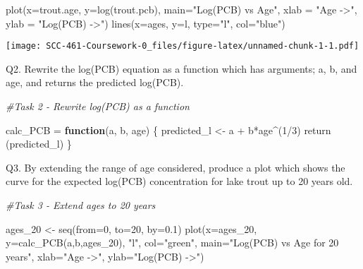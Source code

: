 \documentclass[
]{article}
\newenvironment{Shaded}{\begin{snugshade}}{\end{snugshade}}
\newcommand{\AttributeTok}[1]{\textcolor[rgb]{0.77,0.63,0.00}{#1}}
\newcommand{\CommentTok}[1]{\textcolor[rgb]{0.56,0.35,0.01}{\textit{#1}}}
\newcommand{\ControlFlowTok}[1]{\textcolor[rgb]{0.13,0.29,0.53}{\textbf{#1}}}
\newcommand{\DecValTok}[1]{\textcolor[rgb]{0.00,0.00,0.81}{#1}}
\newcommand{\FloatTok}[1]{\textcolor[rgb]{0.00,0.00,0.81}{#1}}
\newcommand{\FunctionTok}[1]{\textcolor[rgb]{0.00,0.00,0.00}{#1}}
\newcommand{\NormalTok}[1]{#1}
\newcommand{\OtherTok}[1]{\textcolor[rgb]{0.56,0.35,0.01}{#1}}
\newcommand{\SpecialCharTok}[1]{\textcolor[rgb]{0.00,0.00,0.00}{#1}}
\newcommand{\StringTok}[1]{\textcolor[rgb]{0.31,0.60,0.02}{#1}}
\begin{document}
\begin{Shaded}
\begin{Highlighting}[]
\FunctionTok{plot}\NormalTok{(}\AttributeTok{x=}\NormalTok{trout.age, }\AttributeTok{y=}\FunctionTok{log}\NormalTok{(trout.pcb), }\AttributeTok{main=}\StringTok{"Log(PCB) vs Age"}\NormalTok{, }\AttributeTok{xlab =} \StringTok{"Age {-}\textgreater{}"}\NormalTok{, }\AttributeTok{ylab =} \StringTok{"Log(PCB) {-}\textgreater{}"}\NormalTok{)}
\FunctionTok{lines}\NormalTok{(}\AttributeTok{x=}\NormalTok{ages, }\AttributeTok{y=}\NormalTok{l, }\AttributeTok{type=}\StringTok{"l"}\NormalTok{, }\AttributeTok{col=}\StringTok{"blue"}\NormalTok{)}
\end{Highlighting}
\end{Shaded}

\texttt{[image: SCC-461-Coursework-0\_files/figure-latex/unnamed-chunk-1-1.pdf]}

Q2. Rewrite the log(PCB) equation as a function which has arguments; a,
b, and age, and returns the predicted log(PCB).

\begin{Shaded}
\begin{Highlighting}[]
\CommentTok{\#Task 2 {-} Rewrite log(PCB) as a function}

\NormalTok{calc\_PCB }\OtherTok{=} \ControlFlowTok{function}\NormalTok{(a, b, age) \{}
\NormalTok{  predicted\_l }\OtherTok{\textless{}{-}}\NormalTok{ a }\SpecialCharTok{+}\NormalTok{ b}\SpecialCharTok{*}\NormalTok{age}\SpecialCharTok{\^{}}\NormalTok{(}\DecValTok{1}\SpecialCharTok{/}\DecValTok{3}\NormalTok{)}
  \FunctionTok{return}\NormalTok{ (predicted\_l)}
\NormalTok{\}}
\end{Highlighting}
\end{Shaded}

Q3. By extending the range of age considered, produce a plot which shows
the curve for the expected log(PCB) concentration for lake trout up to
20 years old.

\begin{Shaded}
\begin{Highlighting}[]
\CommentTok{\#Task 3 {-} Extend ages to 20 years}

\NormalTok{ages\_20 }\OtherTok{\textless{}{-}} \FunctionTok{seq}\NormalTok{(}\AttributeTok{from=}\DecValTok{0}\NormalTok{, }\AttributeTok{to=}\DecValTok{20}\NormalTok{, }\AttributeTok{by=}\FloatTok{0.1}\NormalTok{)}
\FunctionTok{plot}\NormalTok{(}\AttributeTok{x=}\NormalTok{ages\_20, }\AttributeTok{y=}\FunctionTok{calc\_PCB}\NormalTok{(a,b,ages\_20), }\StringTok{"l"}\NormalTok{, }\AttributeTok{col=}\StringTok{"green"}\NormalTok{, }\AttributeTok{main=}\StringTok{"Log(PCB) vs Age for 20 years"}\NormalTok{, }
     \AttributeTok{xlab=}\StringTok{"Age {-}\textgreater{}"}\NormalTok{, }\AttributeTok{ylab=}\StringTok{"Log(PCB) {-}\textgreater{}"}\NormalTok{)}
\end{Highlighting}
\end{Shaded}
\end{document}
